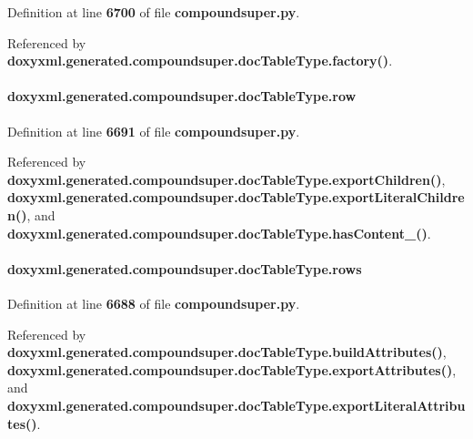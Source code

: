Definition at line {\bf 6700} of file {\bf compoundsuper.\+py}.



Referenced by {\bf doxyxml.\+generated.\+compoundsuper.\+doc\+Table\+Type.\+factory()}.

\paragraph[{row}]{\setlength{\rightskip}{0pt plus 5cm}doxyxml.\+generated.\+compoundsuper.\+doc\+Table\+Type.\+row}\label{classdoxyxml_1_1generated_1_1compoundsuper_1_1docTableType_a5a9a9b761de9de04f253fa0f17cf91da}


Definition at line {\bf 6691} of file {\bf compoundsuper.\+py}.



Referenced by {\bf doxyxml.\+generated.\+compoundsuper.\+doc\+Table\+Type.\+export\+Children()}, {\bf doxyxml.\+generated.\+compoundsuper.\+doc\+Table\+Type.\+export\+Literal\+Children()}, and {\bf doxyxml.\+generated.\+compoundsuper.\+doc\+Table\+Type.\+has\+Content\+\_\+()}.

\paragraph[{rows}]{\setlength{\rightskip}{0pt plus 5cm}doxyxml.\+generated.\+compoundsuper.\+doc\+Table\+Type.\+rows}\label{classdoxyxml_1_1generated_1_1compoundsuper_1_1docTableType_ad14484d1e8bb753d0424d5871c877288}


Definition at line {\bf 6688} of file {\bf compoundsuper.\+py}.



Referenced by {\bf doxyxml.\+generated.\+compoundsuper.\+doc\+Table\+Type.\+build\+Attributes()}, {\bf doxyxml.\+generated.\+compoundsuper.\+doc\+Table\+Type.\+export\+Attributes()}, and {\bf doxyxml.\+generated.\+compoundsuper.\+doc\+Table\+Type.\+export\+Literal\+Attributes()}.

